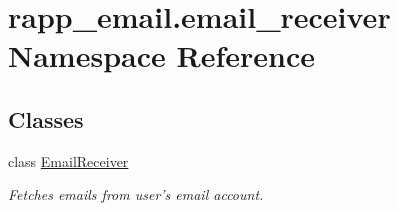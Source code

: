 \hypertarget{namespacerapp__email_1_1email__receiver}{\section{rapp\-\_\-email.\-email\-\_\-receiver Namespace Reference}
\label{namespacerapp__email_1_1email__receiver}
}
\subsection*{Classes}
\begin{DoxyCompactItemize}
\item 
class \hyperlink{classrapp__email_1_1email__receiver_1_1EmailReceiver}{Email\-Receiver}
\begin{DoxyCompactList}\small\item\em Fetches emails from user's email account. \end{DoxyCompactList}\end{DoxyCompactItemize}
